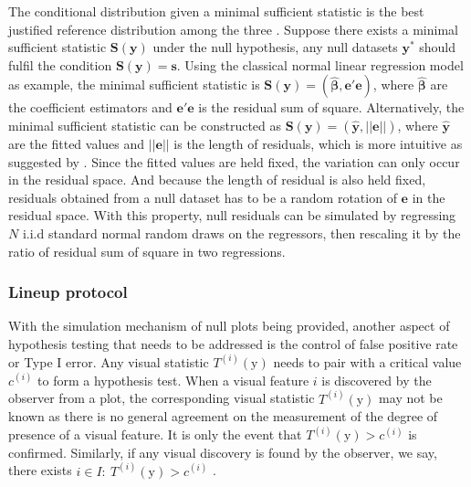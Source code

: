 \documentclass[]{interact}
\theoremstyle{plain}%
\theoremstyle{definition}
\theoremstyle{remark}
\begin{document}
The conditional distribution given a minimal sufficient statistic is the
best justified reference distribution among the three
\citep{buja_statistical_2009}. Suppose there exists a minimal sufficient
statistic \(\boldsymbol{S}(\boldsymbol{y})\) under the null hypothesis,
any null datasets \(\boldsymbol{y^{*}}\) should fulfil the condition
\(\boldsymbol{S}(\boldsymbol{y}) = \boldsymbol{s}\). Using the classical
normal linear regression model as example, the minimal sufficient
statistic is
\(\boldsymbol{S}(\boldsymbol{y}) = (\hat{\boldsymbol{\beta}}, \boldsymbol{e}'\boldsymbol{e})\),
where \(\hat{\boldsymbol{\beta}}\) are the coefficient estimators and
\(\boldsymbol{e}'\boldsymbol{e}\) is the residual sum of square.
Alternatively, the minimal sufficient statistic can be constructed as
\(\boldsymbol{S}(\boldsymbol{y}) = (\hat{\boldsymbol{y}}, ||\boldsymbol{e}||)\),
where \(\hat{\boldsymbol{y}}\) are the fitted values and
\(||\boldsymbol{e}||\) is the length of residuals, which is more
intuitive as suggested by \citet{buja_statistical_2009}. Since the
fitted values are held fixed, the variation can only occur in the
residual space. And because the length of residual is also held fixed,
residuals obtained from a null dataset has to be a random rotation of
\(\boldsymbol{e}\) in the residual space. With this property, null
residuals can be simulated by regressing \(N\) i.i.d standard normal
random draws on the regressors, then rescaling it by the ratio of
residual sum of square in two regressions.

\hypertarget{se:lineup}{%
\subsubsection{Lineup protocol}\label{se:lineup}}

With the simulation mechanism of null plots being provided, another
aspect of hypothesis testing that needs to be addressed is the control
of false positive rate or Type I error. Any visual statistic
\(T^{(i)}(\boldsymbol{\mathrm{y}})\) needs to pair with a critical value
\(c^{(i)}\) to form a hypothesis test. When a visual feature \(i\) is
discovered by the observer from a plot, the corresponding visual
statistic \(T^{(i)}(\boldsymbol{\mathrm{y}})\) may not be known as there
is no general agreement on the measurement of the degree of presence of
a visual feature. It is only the event that
\(T^{(i)}(\boldsymbol{\mathrm{y}}) > c^{(i)}\) is confirmed. Similarly,
if any visual discovery is found by the observer, we say, there exists
\(i \in I:~T^{(i)}(\boldsymbol{\mathrm{y}}) > c^{(i)}\)
\citep{buja_statistical_2009}.
\end{document}
